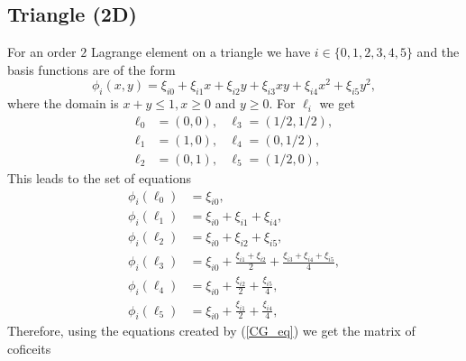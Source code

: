 \documentclass[12pt]{ociamthesis}
\begin{document}
\subsection{Triangle (2D)}
For an order $2$ Lagrange element on a triangle we have $i \in \{0, 1, 2,3,4,5\}$ and the basis functions are of the form
\begin{equation}
\phi_i(x,y) = \xi_{i0} + \xi_{i1} x + \xi_{i2} y + \xi_{i3} xy + \xi_{i4} x^2 + \xi_{i5}y^2,
\end{equation}
where the domain is $x+y\leq 1, x \geq 0$ and $y\geq 0$. For $\ell_i$ we get
\begin{align}
\ell_0 &= (0,0), &\ell_3 = (1/2,1/2), \\
\ell_1 &= (1,0), &\ell_4 = (0,1/2), \\
\ell_2 &= (0,1), &\ell_5 = (1/2,0),
\end{align}
This leads to the set of equations
\begin{align}
\phi_i(\ell_0) &= \xi_{i0}, \\
\phi_i(\ell_1) &= \xi_{i0} + \xi_{i1} + \xi_{i4}, \\
\phi_i(\ell_2) &= \xi_{i0} + \xi_{i2} + \xi_{i5}, \\
\phi_i(\ell_3) &= \xi_{i0} + \frac{\xi_{i1}+\xi_{i2}}{2} + \frac{\xi_{i3} + \xi_{i4} + \xi_{i5}}{4}, \\
\phi_i(\ell_4) &= \xi_{i0} + \frac{\xi_{i2}}{2} + \frac{\xi_{i5}}{4}, \\
\phi_i(\ell_5) &= \xi_{i0} + \frac{\xi_{i1}}{2} + \frac{\xi_{i4}}{4},
\end{align}
Therefore, using the equations created by (\ref{CG_eq}) we get the matrix of coficeits
\end{document}

